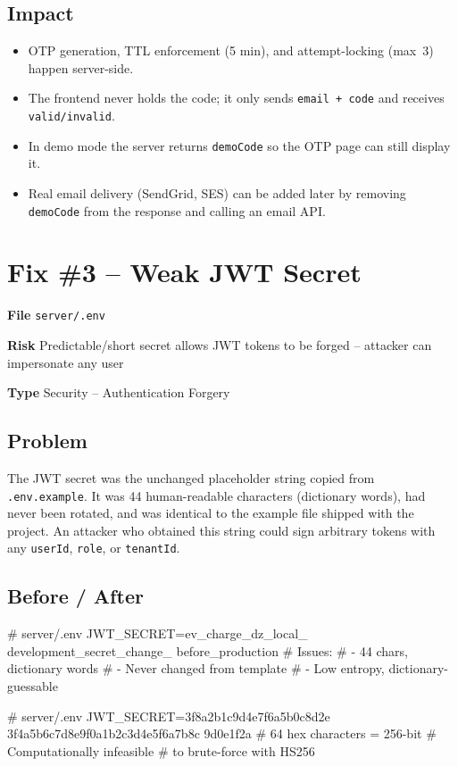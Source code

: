 \documentclass[12pt,a4paper]{report}
\newcommand{\diffL}{\noindent\begin{minipage}[t]{0.485\linewidth}}
\newcommand{\diffR}{\end{minipage}\hfill\begin{minipage}[t]{0.485\linewidth}}
\newcommand{\diffend}{\end{minipage}\par\smallskip}
\newcommand{\inforow}[2]{%
	\noindent
	\begin{tcolorbox}[
		colback   = lightblue,
		colframe  = midblue,
		arc       = 2pt,
		left      = 6pt, right = 6pt, top = 2pt, bottom = 2pt,
		sidebyside, sidebyside align = top seam,
		lefthand width = 3.2cm,
		segmentation hidden,
		]
		\textbf{\color{brandblue}\small #1}
		\tcblower
		{\small\color{labelgray} #2}
	\end{tcolorbox}\vspace{2pt}%
}
\newcommand{\file}[1]{\texttt{\small #1}}
\begin{document}
	\subsection*{Impact}
	\begin{itemize}
		\item OTP generation, TTL enforcement (5 min), and attempt-locking (max~3) happen server-side.
		\item The frontend never holds the code; it only sends \texttt{email + code} and receives \texttt{valid/invalid}.
		\item In demo mode the server returns \texttt{demoCode} so the OTP page can still display it.
		\item Real email delivery (SendGrid, SES) can be added later by removing \texttt{demoCode} from the response and calling an email API.
	\end{itemize}
	
	\section{Fix \#3 -- Weak JWT Secret}
	
	\inforow{File}{\file{server/.env}}
	\inforow{Risk}{Predictable/short secret allows JWT tokens to be forged -- attacker can impersonate any user}
	\inforow{Type}{Security -- Authentication Forgery}
	
	\subsection*{Problem}
	
	The JWT secret was the unchanged placeholder string copied from
	\texttt{.env.example}. It was 44 human-readable characters (dictionary words),
	had never been rotated, and was identical to the example file shipped with the
	project. An attacker who obtained this string could sign arbitrary tokens with
	any \texttt{userId}, \texttt{role}, or \texttt{tenantId}.
	
	\subsection*{Before / After}
	
	\diffL
	\begin{beforecode}
		# server/.env
		JWT_SECRET=ev_charge_dz_local_
		development_secret_change_
		before_production
		# Issues:
		# - 44 chars, dictionary words
		# - Never changed from template
		# - Low entropy, dictionary-guessable
	\end{beforecode}
	\diffR
	\begin{aftercode}
		# server/.env
		JWT_SECRET=3f8a2b1c9d4e7f6a5b0c8d2e
		3f4a5b6c7d8e9f0a1b2c3d4e5f6a7b8c
		9d0e1f2a
		# 64 hex characters = 256-bit
		# Computationally infeasible
		# to brute-force with HS256
	\end{aftercode}
	\diffend
	
\end{document}
